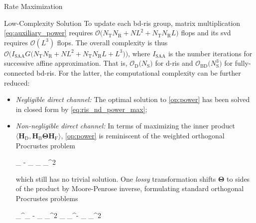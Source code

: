 \documentclass[journal]{IEEEtran}
\begin{document}
\begin{section}{Rate Maximization}
\begin{subsection}{Low-Complexity Solution}
		To update each \gls{bd}-\gls{ris} group, matrix multiplication \eqref{eq:auxiliary_power} requires $\mathcal{O}\bigl(N_\mathrm{T} N_\mathrm{R} + NL^2+N_\mathrm{T} N_\mathrm{R} L\bigr)$ flops and its \gls{svd} requires $\mathcal{O}(L^3)$ flops.
		The overall complexity is thus $\mathcal{O}\bigl(I_\text{SAA} G \bigl(N_\mathrm{T} N_\mathrm{R} + NL^2+N_\mathrm{T} N_\mathrm{R} L + L^3\bigr)\bigr)$, where $I_\text{SAA}$ is the number iterations for successive affine approximation.
		That is, $\mathcal{O}_\mathrm{D}\bigl(N_\mathrm{S}\bigr)$ for \gls{d}-\gls{ris} and $\mathcal{O}_\mathrm{BD}\bigl(N_\mathrm{S}^3\bigr)$ for fully-connected \gls{bd}-\gls{ris}.
		For the latter, the computational complexity can be further reduced:
		\begin{itemize}
			\item \emph{Negligible direct channel:} The optimal solution to \eqref{op:power} has been solved in closed form by \eqref{eq:ris_nd_power_max};
			\item \emph{Non-negligible direct channel:} In terms of maximizing the inner product $\langle \mathbf{H}_\mathrm{D}, \mathbf{H}_\mathrm{B} \mathbf{\Theta} \mathbf{H}_\mathrm{F} \rangle$, \eqref{op:power} is reminiscent of the weighted orthogonal Procrustes problem \cite{Viklands2006}
			\begin{mini!}
				{\scriptstyle{\mathbf{\Theta}}}{\lVert {}_ - _ \mathbf{\Theta} _\mathrm{F} \rVert _^2}{\label{op:procrustes_wt}}{}
			\end{mini!}
			which still has no trivial solution.
			One \emph{lossy} transformation \cite{Bell2003} shifts $\mathbf{\Theta}$ to sides of the product by Moore-Penrose inverse, formulating standard orthogonal Procrustes problems
			\begin{mini!}
				{\scriptstyle{\mathbf{\Theta}}}{\lVert {}_^\dagger {}_ - \mathbf{\Theta} _\mathrm{F} \rVert _^2  \lVert \mathbf{H}_ _^\dagger - _ \mathbf{\Theta} \rVert _^2}{\label{op:procrustes}}{}

\end{mini!}
\end{itemize}
\end{subsection}
\end{section}
\end{document}
